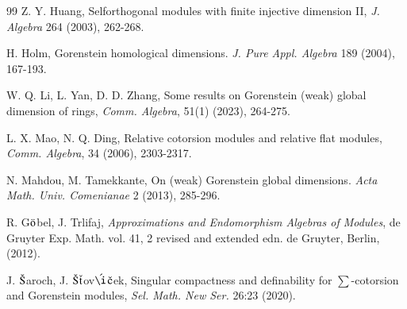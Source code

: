 \documentclass[11pt,a4paper]{article}
\begin{document}
\begin{thebibliography}{99}
 Z. Y. Huang, Selforthogonal modules with finite injective dimension II, {\it J. Algebra} 264 (2003),   262-268.

 H. Holm,  Gorenstein homological dimensions. {\it J. Pure Appl. Algebra} 189 (2004), 167-193.  

 W. Q. Li, L. Yan,  D. D. Zhang,  Some results on Gorenstein (weak) global dimension of rings, {\it Comm. Algebra}, 51(1) (2023),  264-275.

  L. X. Mao,  N. Q. Ding,  Relative cotorsion modules and relative flat modules, {\it Comm. Algebra}, 34 (2006), 2303-2317.

 N.  Mahdou, M. Tamekkante, On (weak) Gorenstein global dimensions. {\it Acta Math. Univ. Comenianae} 2  (2013), 285-296.

 R. G$\ddot{\rm o}$bel, J. Trlifaj, {\it Approximations and Endomorphism Algebras of Modules}, de Gruyter Exp. Math. vol.
41,  2 revised and extended edn. de Gruyter, Berlin, (2012).


  J. $\check{\rm S}$aroch, J. $\check{\rm S}$$\check{\rm t}$ov$\acute{\rm {\i}}$$\check{\rm c}$ek,   Singular compactness and definability for $\sum$-cotorsion and Gorenstein modules,
{\it Sel. Math. New Ser.} 26:23 (2020). 
 \end{thebibliography}
\end{document}

